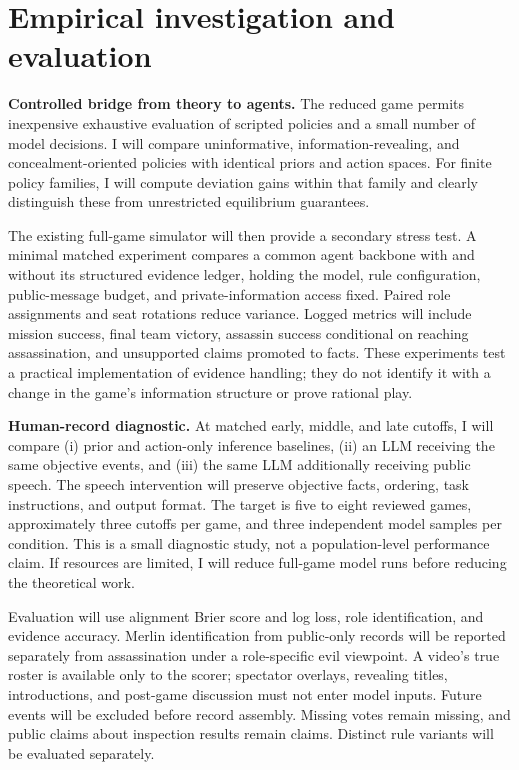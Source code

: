 \documentclass[11pt,letterpaper]{article}
\begin{document}
\section{Empirical investigation and evaluation}
\textbf{Controlled bridge from theory to agents.} The reduced game permits inexpensive exhaustive evaluation of scripted policies and a small number of model decisions. I will compare uninformative, information-revealing, and concealment-oriented policies with identical priors and action spaces. For finite policy families, I will compute deviation gains within that family and clearly distinguish these from unrestricted equilibrium guarantees.

The existing full-game simulator will then provide a secondary stress test. A minimal matched experiment compares a common agent backbone with and without its structured evidence ledger, holding the model, rule configuration, public-message budget, and private-information access fixed. Paired role assignments and seat rotations reduce variance. Logged metrics will include mission success, final team victory, assassin success conditional on reaching assassination, and unsupported claims promoted to facts. These experiments test a practical implementation of evidence handling; they do not identify it with a change in the game's information structure or prove rational play.

\textbf{Human-record diagnostic.} At matched early, middle, and late cutoffs, I will compare (i) prior and action-only inference baselines, (ii) an LLM receiving the same objective events, and (iii) the same LLM additionally receiving public speech. The speech intervention will preserve objective facts, ordering, task instructions, and output format. The target is five to eight reviewed games, approximately three cutoffs per game, and three independent model samples per condition. This is a small diagnostic study, not a population-level performance claim. If resources are limited, I will reduce full-game model runs before reducing the theoretical work.

Evaluation will use alignment Brier score and log loss, role identification, and evidence accuracy. Merlin identification from public-only records will be reported separately from assassination under a role-specific evil viewpoint. A video's true roster is available only to the scorer; spectator overlays, revealing titles, introductions, and post-game discussion must not enter model inputs. Future events will be excluded before record assembly. Missing votes remain missing, and public claims about inspection results remain claims. Distinct rule variants will be evaluated separately.
\end{document}
